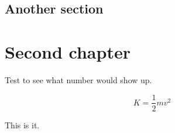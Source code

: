 \documentclass[noocg]{wwwnotes2}
\begin{document}
\lipsum[3-8]



\section{Another section}

\lipsum[5-9]

\chapter{Second chapter}

Test \theequation to see what number would show up.

\lipsum[10-23]

\begin{equation}
K = \frac12 mv^2
\end{equation}

This is it.



\cleardoublepage
{}
{}


\end{document}
